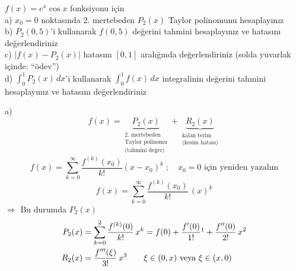 \documentclass[11pt,a4paper]{article}
\begin{document}
\begin{ornek}
$f(x) = e^x\cos x$ fonksiyonu için\\
a) $x_0 = 0$ noktasında 2. mertebeden $P_2(x)$ Taylor polinomunu hesaplayınız\\
b) $P_2(0{,}5)$'i kullanarak $f(0{,}5)$ değerini tahmini hesaplayınız ve hatasını değerlendiriniz\\
c) $|f(x) - P_2(x)|$ hatasını $[0,1]$ aralığında değerlendiriniz \hfill{\small(solda yuvarlak içinde: ``ödev'')}\\
d) $\displaystyle\int_0^1 P_2(x)\,dx$'i kullanarak $\displaystyle\int_0^1 f(x)\,dx$ integralinin değerini tahmini
hesaplayınız ve hatasını değerlendiriniz
\end{ornek}

\noindent a)
\[
  f(x) = \underset{\substack{\text{2. mertebeden}\\ \text{Taylor polinomu}\\ \text{(tahmini değer)}}}{\underbrace{P_2(x)}}
  + \underset{\substack{\text{kalan terim}\\ \text{(kesim hatası)}}}{\underbrace{R_2(x)}}
\]
\[
  f(x) = \sum_{k=0}^{\infty} \frac{f^{(k)}(x_0)}{k!}(x-x_0)^k \;; \quad x_0 = 0 \text{ için yeniden yazalım}
\]
\[
  f(x) = \sum_{k=0}^{\infty} \frac{f^{(k)}(x_0)}{k!}\,(x)^k
\]
$\Rightarrow$ Bu durumda $P_2(x)$
\begin{align*}
  P_2(x) &= \sum_{k=0}^{2} \frac{f^{(k)}(0)}{k!}\,x^k = f(0) + \frac{f'(0)}{1!}\footnotemark + \frac{f''(0)}{2!}\,x^2\\
  R_2(x) &= \frac{f'''(\xi)}{3!}\,x^3 \qquad \xi \in (0,x) \ \text{veya}\ \xi \in (x,0)
\end{align*}
\end{document}
